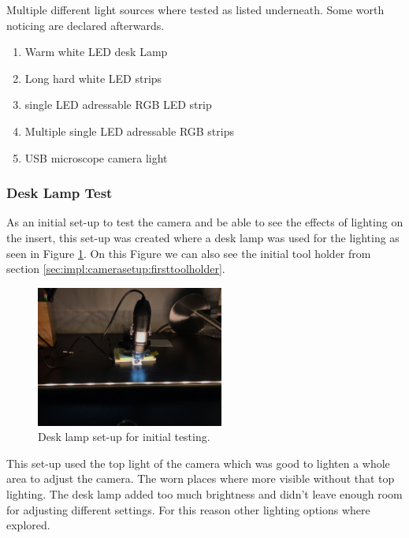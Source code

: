 	Multiple different light sources where tested as listed underneath. Some worth noticing are declared afterwards.

		\begin{enumerate}
			\item Warm white LED desk Lamp
			\item Long hard white LED strips 
			\item single LED adressable RGB LED strip
			\item Multiple single LED adressable RGB strips
			\item USB microscope camera light
		\end{enumerate}
		
		\subsubsection{Desk Lamp Test}

			As an initial set-up to test the camera and be able to see the effects of lighting on the insert, this set-up was created where a desk lamp was used for the lighting as seen in Figure \ref{fig:setup:desklamp}. On this Figure we can also see the initial tool holder from section \ref{sec:impl:camerasetup:firsttoolholder}.

			\begin{figure}[hbtp]
				\centering
				\includegraphics[width=0.55\textwidth, keepaspectratio=true]{./fig/Camera_setup/Light/Desk_Lamp_Test/eerste_setup_andere_richting.jpeg}
				\caption{Desk lamp set-up for initial testing.}
				\label{fig:setup:desklamp}
			\end{figure}

			This set-up used the top light of the camera which was good to lighten a whole area to adjust the camera. The worn places where more visible without that top lighting. The desk lamp added too much brightness and didn't leave enough room for adjusting different settings. For this reason other lighting options where explored.

